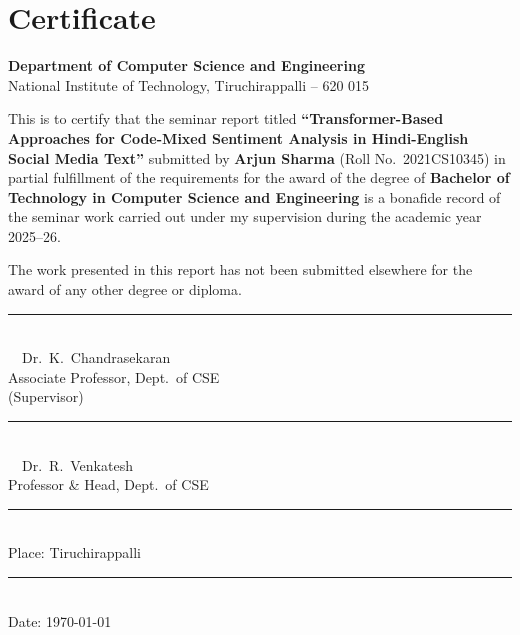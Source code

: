 \chapter*{Certificate}

\vspace{10pt}
\begin{center}
{\large\bfseries\color{accent} Department of Computer Science and Engineering}\\[4pt]
{\color{graytext} National Institute of Technology, Tiruchirappalli -- 620 015}
\end{center}

\vspace{16pt}

\noindent This is to certify that the seminar report titled \textbf{``Transformer-Based Approaches for Code-Mixed Sentiment Analysis in Hindi-English Social Media Text''} submitted by \textbf{Arjun Sharma} (Roll No.\ 2021CS10345) in partial fulfillment of the requirements for the award of the degree of \textbf{Bachelor of Technology in Computer Science and Engineering} is a bonafide record of the seminar work carried out under my supervision during the academic year 2025--26.

\vspace{10pt}
\noindent The work presented in this report has not been submitted elsewhere for the award of any other degree or diploma.

\vspace{28pt}

\noindent
\begin{minipage}[t]{0.48\textwidth}
  \centering
  \rule{0.7\textwidth}{0.4pt}\\[4pt]
  {\small\color{graytext} \faChalkboardTeacher\ \ Dr.\ K.\ Chandrasekaran}\\[2pt]
  {\footnotesize\color{graytext} Associate Professor, Dept.\ of CSE}\\[2pt]
  {\footnotesize\color{graytext} (Supervisor)}
\end{minipage}
\hfill
\begin{minipage}[t]{0.48\textwidth}
  \centering
  \rule{0.7\textwidth}{0.4pt}\\[4pt]
  {\small\color{graytext} \faUser\ \ Dr.\ R.\ Venkatesh}\\[2pt]
  {\footnotesize\color{graytext} Professor \& Head, Dept.\ of CSE}
\end{minipage}

\vspace{24pt}

\noindent
\begin{minipage}[t]{0.48\textwidth}
  \centering
  \rule{0.7\textwidth}{0.4pt}\\[4pt]
  {\small\color{graytext} Place: Tiruchirappalli}
\end{minipage}
\hfill
\begin{minipage}[t]{0.48\textwidth}
  \centering
  \rule{0.7\textwidth}{0.4pt}\\[4pt]
  {\small\color{graytext} Date: \today}
\end{minipage}

\clearpage

